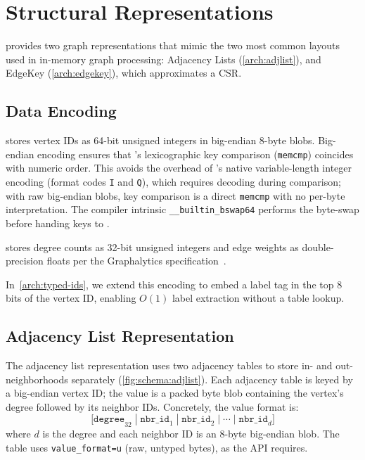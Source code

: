 \section{Structural Representations}
\label{arch:structural-reps}

\project{} provides two graph representations that mimic the two most common layouts used in in-memory graph processing: Adjacency Lists (\autoref{arch:adjlist}), and EdgeKey (\autoref{arch:edgekey}), which approximates a CSR.

\subsection{Data Encoding}
\label{arch:data-encoding}

\project{} stores vertex IDs as 64-bit unsigned integers in big-endian 8-byte blobs.
Big-endian encoding ensures that \wt{}'s lexicographic key comparison (\texttt{memcmp}) coincides with numeric order.
This avoids the overhead of \wt{}'s native variable-length integer encoding (format codes \texttt{I} and \texttt{Q}), which requires decoding during comparison; with raw big-endian blobs, key comparison is a direct \texttt{memcmp} with no per-byte interpretation.
The compiler intrinsic \texttt{\_\_builtin\_bswap64} performs the byte-swap before handing keys to \wt{}.

\project{} stores degree counts as 32-bit unsigned integers and edge weights as double-precision floats per the Graphalytics specification~\cite{capotua2015graphalytics}.

In~\autoref{arch:typed-ids}, we extend this encoding to embed a label tag in the top 8 bits of the vertex ID, enabling $O(1)$ label extraction without a table lookup.

\subsection{Adjacency List Representation}
\label{arch:adjlist}

The adjacency list representation uses two adjacency tables to store in- and out-neighborhoods separately (\autoref{fig:schema:adjlist}).
Each adjacency table is keyed by a big-endian vertex ID; the value is a packed byte blob containing the vertex's degree followed by its neighbor IDs.
Concretely, the value format is:
\[
  \texttt{[degree}_{32} \;|\; \texttt{nbr\_id}_1 \;|\; \texttt{nbr\_id}_2 \;|\; \cdots \;|\; \texttt{nbr\_id}_{d}\texttt{]}
\]
where $d$ is the degree and each neighbor ID is an 8-byte big-endian blob.
The table uses \texttt{value\_format=u} (raw, untyped bytes), as the  API requires.

